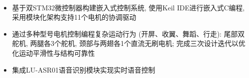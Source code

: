 
\vspace{-4mm}

{\hfill{} \\
\hfill{}}

\nopagebreak\vspace{1mm}\nopagebreak
{}
\begin{justify}
\fontsize{10.5pt}{1.25em}\bodyfontlight\upshape\color{text}%
\begin{itemize}[leftmargin=2ex, nosep, noitemsep]
  \setlength{\parskip}{0pt}
  \renewcommand{\labelitemi}{\bullet}
  \item 基于双STM32微控制器构建嵌入式控制系统, 使用Keil IDE进行嵌入式C编程, 采用模块化架构支持11个电机的协调驱动
  \item 通过多种型号电机控制编程复杂运动行为 (开屏、收翼、舞蹈、行走): 尾部双舵机, 两腿各3个舵机, 颈部与两翅各1个直流无刷电机; 完成三次设计迭代以优化运动平滑性与结构可靠性
  \item 集成LU-ASR01语音识别模块实现实时语音控制
\end{itemize}
\end{justify}
\vspace{1mm}
